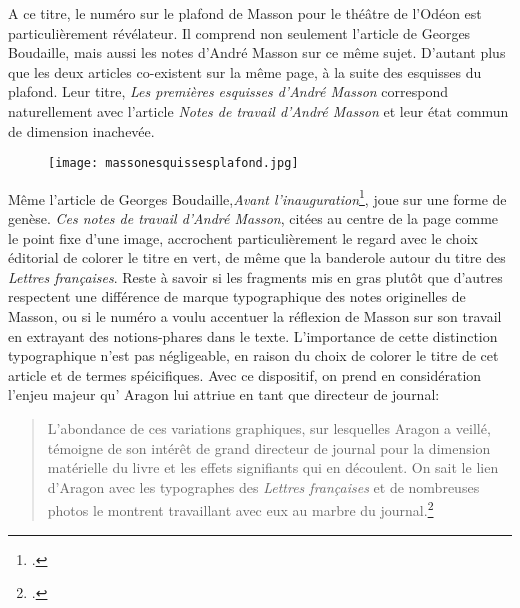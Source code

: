 	A ce titre, le numéro sur le plafond de Masson pour le théâtre de l’Odéon est particulièrement révélateur. Il comprend non seulement l’article de Georges Boudaille, mais aussi les notes d’André Masson sur ce même sujet. D’autant plus que les deux articles co-existent sur la même page, à la suite des esquisses du plafond. Leur titre, \emph{Les premières esquisses d’André Masson} correspond naturellement avec l’article \emph{Notes de travail d’André Masson} et leur état commun de dimension inachevée. 

	\begin{figure}[H]
   \centering
   \texttt{[image: massonesquissesplafond.jpg]}
	\caption{\cite{plafondodeon}}\label{fig:Notesdetravail}
\end{figure}



Même l’article de Georges Boudaille,\emph{Avant l’inauguration}\footcite{avantinauguration}, joue sur une forme de genèse. \emph{Ces notes de travail d’André Masson}, citées au centre de la page comme le point fixe d’une image, accrochent particulièrement le regard avec le choix éditorial de colorer le titre en vert, de même que la banderole autour du titre des \emph{Lettres françaises}. Reste à savoir si les fragments mis en gras plutôt que d’autres respectent une différence de marque typographique des notes originelles de Masson, ou si le numéro a voulu accentuer la réflexion de Masson sur son travail en extrayant des notions-phares dans le texte. L’importance de cette distinction typographique n’est pas négligeable, en raison du choix de colorer le titre de cet article et de termes spéicifiques. Avec ce dispositif, on prend en considération l’enjeu majeur qu’ Aragon lui attriue en tant que directeur de journal: 

\begin{quote}
L’abondance de ces variations graphiques, sur lesquelles Aragon a veillé, témoigne de son intérêt de grand directeur de journal pour la dimension matérielle du livre et les effets signifiants qui en découlent. On sait le lien d’Aragon avec les typographes des \emph{Lettres françaises }et de nombreuses photos le montrent travaillant avec eux au marbre du journal.\footcite[p333]{vasseviere}	
\end{quote}

